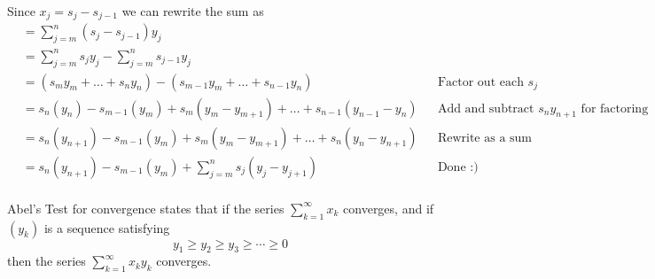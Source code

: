 \begin{solution}
  Since $x_j = s_j - s_{j-1}$ we can rewrite the sum as
  $$
  \begin{aligned}
    &= \sum_{j=m}^n (s_j - s_{j-1})y_j \\
    &= \sum_{j=m}^n s_j y_j - \sum_{j=m}^n s_{j-1} y_j \\
    &= (s_my_m + \dots + s_ny_n) - (s_{m-1}y_m + \dots + s_{n-1}y_n)                  &&\text{Factor out each } s_j\\
    &= s_n(y_n) - s_{m-1}(y_m) + s_m(y_m - y_{m+1}) + \dots + s_{n-1}(y_{n-1} - y_n)  &&\text{Add and subtract } s_ny_{n+1} \text{ for factoring} \\
    &= s_n(y_{n+1}) - s_{m-1}(y_m) + s_m(y_m - y_{m+1}) + \dots + s_n(y_n - y_{n+1})  &&\text{Rewrite as a sum} \\
    &= s_n(y_{n+1}) - s_{m-1}(y_m) + \sum_{j=m}^n s_j(y_j - y_{j+1})                  &&\text{Done :)} \\
  \end{aligned}
  $$
\end{solution}

\begin{exercise}
  Abel's Test for convergence states that if the series $\sum_{k=1}^{\infty} x_{k}$ converges, and if $\left(y_{k}\right)$ is a sequence satisfying
  $$
  y_{1} \geq y_{2} \geq y_{3} \geq \cdots \geq 0
  $$
  then the series $\sum_{k=1}^{\infty} x_{k} y_{k}$ converges.
\end{exercise}

